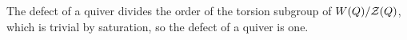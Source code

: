 \begin{lemma}[Defect]\label{sh-0020}
The defect of a quiver divides the order of the torsion subgroup of $W(Q) / \mathcal{Z}(Q)$, which is trivial by saturation, so the defect of a quiver is one.
\end{lemma}
